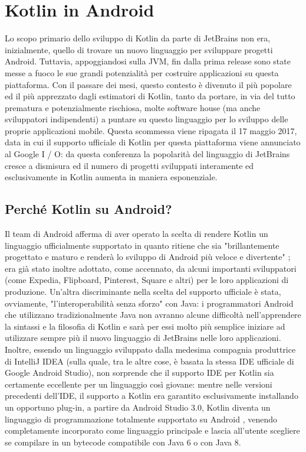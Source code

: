 
\chapter{Kotlin in Android}\label{ch:android}

Lo scopo primario dello sviluppo di Kotlin da parte di JetBrains non era, inizialmente, quello di trovare un nuovo linguaggio per sviluppare progetti Android. Tuttavia, appoggiandosi sulla JVM, fin dalla prima release sono state messe a fuoco le sue grandi potenzialità per costruire applicazioni su questa piattaforma. Con il passare dei mesi, questo contesto è divenuto il più popolare ed il più apprezzato dagli estimatori di Kotlin, tanto da portare, in via del tutto prematura e potenzialmente rischiosa, molte software house (ma anche sviluppatori indipendenti) a puntare su questo linguaggio per lo sviluppo delle proprie applicazioni mobile. Questa scommessa viene ripagata il 17 maggio 2017, data in cui il supporto ufficiale di Kotlin per questa piattaforma viene annunciato al Google I / O: da questa conferenza la popolarità del linguaggio di JetBrains cresce a dismisura ed il numero di progetti sviluppati interamente ed esclusivamente in Kotlin aumenta in maniera esponenziale.\\

\section{Perché Kotlin su Android?}
Il team di Android afferma di aver operato la scelta di rendere Kotlin un linguaggio ufficialmente supportato in quanto ritiene che sia "brillantemente progettato e maturo e renderà lo sviluppo di Android più veloce e divertente" \cite{ktOnAndroidDevBlog}; era già stato inoltre adottato, come accennato, da alcuni importanti sviluppatori (come Expedia, Flipboard, Pinterest, Square e altri) per le loro applicazioni di produzione. Un'altra discriminante nella scelta del supporto ufficiale è stata, ovviamente, "l'interoperabilità senza sforzo" con Java: i programmatori Android che utilizzano tradizionalmente Java non avranno alcune difficoltà nell’apprendere la sintassi e la filosofia di Kotlin e sarà per essi molto più semplice iniziare ad utilizzare sempre più il nuovo linguaggio di JetBrains nelle loro applicazioni. Inoltre, essendo un linguaggio sviluppato dalla medesima compagnia produttrice di IntelliJ IDEA (sulla quale, tra le altre cose, è basata la stessa IDE ufficiale di Google Android Studio), non sorprende che il supporto IDE per Kotlin sia certamente eccellente per un linguaggio così giovane: mentre nelle versioni precedenti dell'IDE, il supporto a Kotlin era garantito esclusivamente installando un opportuno plug-in, a partire da Android Studio 3.0, Kotlin diventa un linguaggio di programmazione totalmente supportato su Android \cite{ktUpdateAndroidDevBlog}, venendo completamente incorporato come linguaggio principale e lascia all'utente scegliere se compilare in un bytecode compatibile con Java 6 o con Java 8.\\

